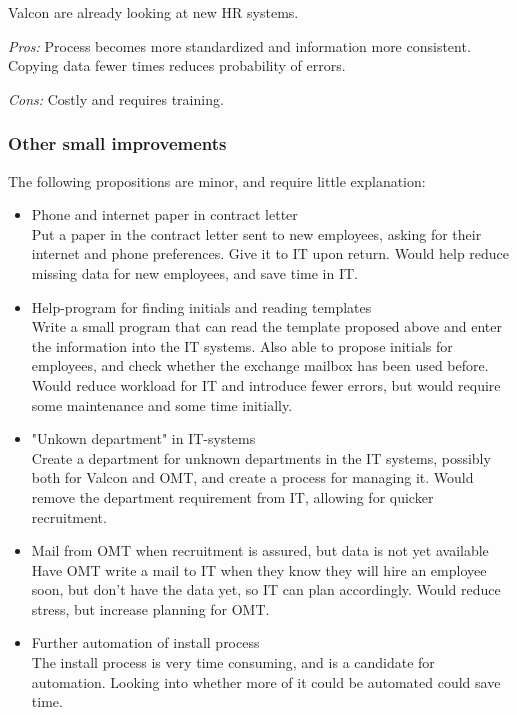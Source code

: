 Valcon are already looking at new HR systems.

\noindent \emph{Pros:} Process becomes more standardized and information more consistent. Copying data fewer times reduces probability of errors.

\noindent \emph{Cons:} Costly and requires training.

\subsubsection{Other small improvements}
The following propositions are minor, and require little explanation:
\begin{itemize}
	\item Phone and internet paper in contract letter\\
	
			Put a paper in the contract letter sent to new employees, asking for their internet and phone preferences. Give it to IT upon return. Would help reduce missing data for new employees, and save time in IT.

	\item Help-program for finding initials and reading templates\\
	
			Write a small program that can read the template proposed above and enter the information into the IT systems.
			Also able to propose initials for employees, and check whether the exchange mailbox has been used before.
			Would reduce workload for IT and introduce fewer errors, but would require some maintenance and some time initially.
	
	\item "Unkown department" in IT-systems\\
	
			Create a department for unknown departments in the IT systems, possibly both for Valcon and OMT, and create a process for managing it.
			Would remove the department requirement from IT, allowing for quicker recruitment.
			
	\item Mail from OMT when recruitment is assured, but data is not yet available\\
	
			Have OMT write a mail to IT when they know they will hire an employee soon, but don't have the data yet, so IT can plan accordingly.
			Would reduce stress, but increase planning for OMT.
			
	\item Further automation of install process\\
	
			The install process is very time consuming, and is a candidate for automation.
			Looking into whether more of it could be automated could save time.
\end{itemize}

